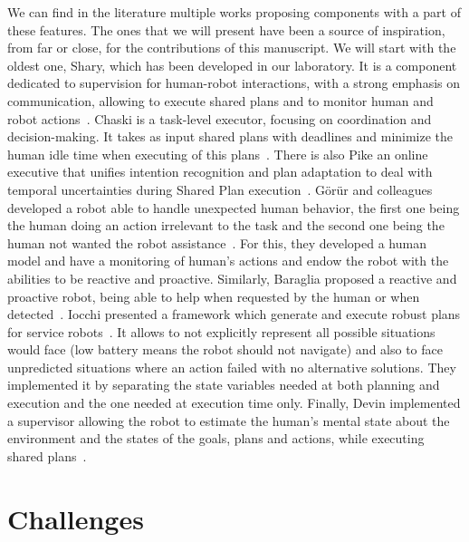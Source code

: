\documentclass[a4paper,11pt,twoside]{StyleThese}
\begin{document}
We can find in the literature multiple works proposing components with a part of these features. The ones that we will present have been a source of inspiration, from far or close, for the contributions of this manuscript. We will start with the oldest one, Shary, which has been developed in our laboratory. It is a component dedicated to supervision for human-robot interactions, with a strong emphasis on communication, allowing to execute shared plans and to monitor human and robot actions~\cite{clodic_2009_shary}. Chaski is a task-level executor, focusing on coordination and decision-making. It takes as input shared plans with deadlines and minimize the human idle time when executing of this plans~\cite{shah_2011_improved}. There is also Pike an online executive that unifies intention recognition and plan adaptation to deal with temporal uncertainties during Shared Plan execution~\cite{karpas_2015_robust}. G\"{o}r\"{u}r and colleagues developed a robot able to handle unexpected human behavior, the first one being the human doing an action irrelevant to the task and the second one being the human not wanted the robot assistance~\cite{gorur_2017_toward, gorur_2018_social}. For this, they developed a human model and have a monitoring of human's actions and endow the robot with the abilities to be reactive and proactive. Similarly, Baraglia \etal{} proposed a reactive and proactive robot, being able to help when requested by the human or when detected~\cite{baraglia_2017_efficient}. Iocchi \etal{} presented a framework which generate and execute robust plans for service robots~\cite{iocchi_2016_practical}. It allows to not explicitly represent all possible situations would face (\eg low battery means the robot should not navigate) and also to face unpredicted situations where an action failed with no alternative solutions. They implemented it by separating the state variables needed at both planning and execution and the one needed at execution time only. Finally, Devin \etal{} implemented a supervisor allowing the robot to estimate the human's mental state about the environment and the states of the goals, plans and actions, while executing shared plans~\cite{devin_2016_implemented}.


\section{Challenges}




\ifdefined{}
\else


\end{document}
